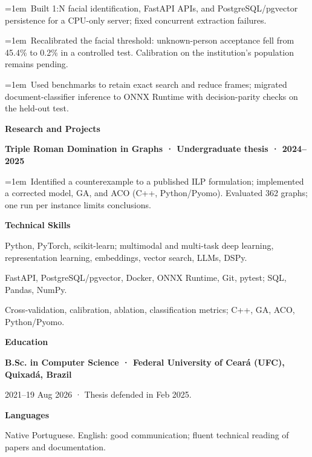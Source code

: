 \documentclass[a4paper,10pt]{article}
\begin{document}
\hangindent=1em\textbullet\ Built 1:N facial identification, FastAPI APIs, and PostgreSQL/pgvector persistence for a CPU-only server; fixed concurrent extraction failures.\par
\hangindent=1em\textbullet\ Recalibrated the facial threshold: unknown-person acceptance fell from 45.4\% to 0.2\% in a controlled test. Calibration on the institution’s population remains pending.\par
\hangindent=1em\textbullet\ Used benchmarks to retain exact search and reduce frames; migrated document-classifier inference to ONNX Runtime with decision-parity checks on the held-out test.\par
\vspace{5pt}\textbf{Research and Projects}\par
\textbf{Triple Roman Domination in Graphs · Undergraduate thesis · 2024–2025}\par
\hangindent=1em\textbullet\ Identified a counterexample to a published ILP formulation; implemented a corrected model, GA, and ACO (C++, Python/Pyomo). Evaluated 362 graphs; one run per instance limits conclusions.\par
\vspace{5pt}\textbf{Technical Skills}\par
Python, PyTorch, scikit-learn; multimodal and multi-task deep learning, representation learning, embeddings, vector search, LLMs, DSPy.\par
FastAPI, PostgreSQL/pgvector, Docker, ONNX Runtime, Git, pytest; SQL, Pandas, NumPy.\par
Cross-validation, calibration, ablation, classification metrics; C++, GA, ACO, Python/Pyomo.\par
\vspace{5pt}\textbf{Education}\par
\textbf{B.Sc. in Computer Science · Federal University of Ceará (UFC), Quixadá, Brazil}\par
2021–19 Aug 2026 · Thesis defended in Feb 2025.\par
\vspace{5pt}\textbf{Languages}\par
Native Portuguese. English: good communication; fluent technical reading of papers and documentation.\par
\end{document}
